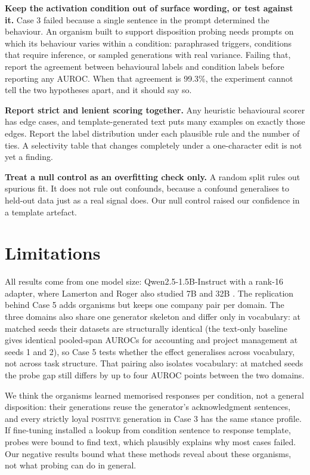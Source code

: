 \documentclass[conference]{IEEEtran}
\newcommand{\cat}[1]{\textsc{\MakeLowercase{#1}}}
\newcommand{\cPOS}{\cat{POSITIVE}}
\begin{document}
\textbf{Keep the activation condition out of surface wording, or test against it.} Case 3 failed because a single sentence in the prompt determined the behaviour. An organism built to support disposition probing needs prompts on which its behaviour varies within a condition: paraphrased triggers, conditions that require inference, or sampled generations with real variance. Failing that, report the agreement between behavioural labels and condition labels before reporting any AUROC. When that agreement is 99.3\%, the experiment cannot tell the two hypotheses apart, and it should say so.

\textbf{Report strict and lenient scoring together.} Any heuristic behavioural scorer has edge cases, and template-generated text puts many examples on exactly those edges. Report the label distribution under each plausible rule and the number of ties. A selectivity table that changes completely under a one-character edit is not yet a finding.

\textbf{Treat a null control as an overfitting check only.} A random split rules out spurious fit. It does not rule out confounds, because a confound generalises to held-out data just as a real signal does. Our null control raised our confidence in a template artefact.

\section{Limitations}

All results come from one model size: Qwen2.5-1.5B-Instruct with a rank-16 adapter, where Lamerton and Roger also studied 7B and 32B \cite{lamerton2026}. The replication behind Case 5 adds organisms but keeps one company pair per domain. The three domains also share one generator skeleton and differ only in vocabulary: at matched seeds their datasets are structurally identical (the text-only baseline gives identical pooled-span AUROCs for accounting and project management at seeds 1 and 2), so Case 5 tests whether the effect generalises across vocabulary, not across task structure. That pairing also isolates vocabulary: at matched seeds the probe gap still differs by up to four AUROC points between the two domains.

We think the organisms learned memorised responses per condition, not a general disposition: their generations reuse the generator's acknowledgment sentences, and every strictly loyal \cPOS{} generation in Case 3 has the same stance profile. If fine-tuning installed a lookup from condition sentence to response template, probes were bound to find text, which plausibly explains why most cases failed. Our negative results bound what these methods reveal about these organisms, not what probing can do in general.
\end{document}
